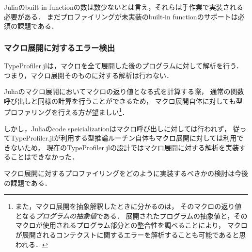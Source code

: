 Juliaのbuilt-in functionの数は数少ないとは言え，それらは手作業で実装される必要がある．
まだプロファイリングが未実装のbuilt-in functionのサポートは必須の課題である．

\subsubsection{マクロ展開に対するエラー検出}

TypeProfiler.jlは，マクロを全て展開した後のプログラムに対して解析を行う．
つまり，マクロ展開そのものに対する解析は行わない．

Juliaのマクロ展開においてマクロの返り値となる式を計算する際，
通常の関数呼び出しと同様の計算を行うことができるため，
マクロ展開自体に対しても型プロファリングを行える方が望ましい\footnote{
  また，マクロ展開を抽象解釈したときに分かるのは，
  そのマクロの返り値となる\textit{プログラムの抽象値}である．
  展開されたプログラムの抽象値と，そのマクロが使用されるプログラム部分との整合性を調べることにより，
  マクロが展開されるコンテクストに関するエラーを解析することも可能であると思われる．
}．

しかし，Juliaのcode speicializationはマクロ呼び出しに対しては行われず，
従ってTypeProfiler.jlが利用する型推論ルーチン自体もマクロ展開に対しては利用できないため，
現在のTypeProfiler.jlの設計ではマクロ展開に対する解析を実装することはできなかった．

マクロ展開に対するプロファイリングをどのように実装するべきかの検討は今後の課題である．
